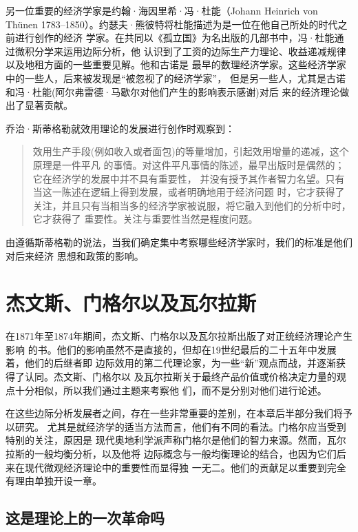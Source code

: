 另一位重要的经济学家是约翰·海因里希·冯·杜能（Johann Heinrich von Thünen
1783--1850）。约瑟夫·熊彼特将杜能描述为是一位在他自己所处的时代之前进行创作的经济
学家。在共同以《孤立国》为名出版的几部书中，冯·杜能通过微积分学来运用边际分析，他
认识到了工资的边际生产力理论、收益递减规律以及地租方面的一些重要见解。他和古诺是
最早的数理经济学家。这些经济学家中的一些人，后来被发现是“被忽视了的经济学家”，
但是另一些人，尤其是古诺和冯·杜能(阿尔弗雷德·马歇尔对他们产生的影响表示感谢)对后
来的经济理论做出了显著贡献。

乔治·斯蒂格勒就效用理论的发展进行创作时观察到：

\begin{quotation}
  效用生产手段(例如收入或者面包)的等量增加，引起效用增量的递减，这个原理是一件平凡
  的事情。对这件平凡事情的陈述，最早出版时是偶然的；它在经济学的发展中并不具有重要性，
  并没有授予其作者智力名望。只有当这一陈述在逻辑上得到发展，或者明确地用于经济问题
  时，它才获得了关注，并且只有当相当多的经济学家被说服，将它融入到他们的分析中时，它才获得了
  重要性。关注与重要性当然是程度问题。
\end{quotation}

由遵循斯蒂格勒的说法，当我们确定集中考察哪些经济学家时，我们的标准是他们对后来经济
思想和政策的影响。

\section{杰文斯、门格尔以及瓦尔拉斯}

在1871年至1874年期间，杰文斯、门格尔以及瓦尔拉斯出版了对正统经济理论产生影响
的书。他们的影响虽然不是直接的，但却在19世纪最后的二十五年中发展着，他们的后继者即
边际效用的第二代理论家，为一些“新”观点而战，并逐渐获得了认同。杰文斯、门格尔以
及瓦尔拉斯关于最终产品价值或价格决定力量的观点十分相似，所以我们通过主题来考察他
们，而不是分别对他们进行论述。

在这些边际分析发展者之间，存在一些非常重要的差别，在本章后半部分我们将予以研究。
尤其是就经济学的适当方法而言，他们有不同的看法。门格尔应当受到特别的关注，原因是
现代奥地利学派声称门格尔是他们的智力来源。然而，瓦尔拉斯的一般均衡分析，以及他将
边际概念与一般均衡理论的结合，也因为它们后来在现代微观经济理论中的重要性而显得独
一无二。他们的贡献足以重要到完全有理由单独开设一章。

\subsection{这是理论上的一次革命吗}

